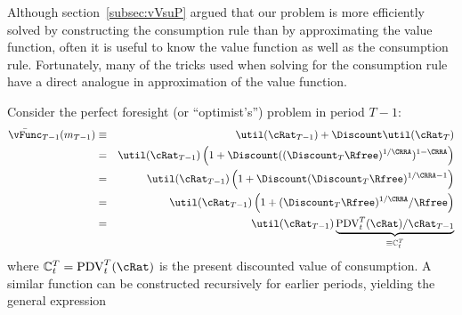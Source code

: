 
  Although section~\ref{subsec:vVsuP} argued that our problem is more
  efficiently solved by constructing the consumption rule than by
  approximating the value function, often it is useful to know the
  value function as well as the consumption rule.  Fortunately, many
  of the tricks used when solving for the consumption rule have a
  direct analogue in approximation of the value function.

  Consider the perfect foresight (or ``optimist's'') problem in period $T-1$:
  \begin{eqnarray*}
    \bar{\vFunc}_{T-1}({m}_{T-1}) & \equiv & \util(\cRat_{T-1})+\Discount \util(\cRat_{T})
    \\ & = & \util(\cRat_{T-1})\left(1+\Discount ((\Discount_{T}\Rfree)^{1/\CRRA})^{1-\CRRA}\right)
    \\ & = & \util(\cRat_{T-1})\left(1+\Discount (\Discount_{T}\Rfree)^{1/\CRRA-1}\right)
    \\ & = & \util(\cRat_{T-1})\left(1+(\Discount_{T}\Rfree)^{1/\CRRA}/\Rfree\right)
    \\ & = & \util(\cRat_{T-1})\underbrace{\mbox{PDV}_{t}^{T}(\cRat)/\cRat_{T-1}}_{\equiv \mathbb{C}_{t}^{T}}
  \end{eqnarray*}
  where $\mathbb{C}_{t}^{T}=\mbox{PDV}_{t}^{T}(\cRat)$ is the present discounted value of consumption.
  A similar function can be constructed recursively for earlier periods, yielding
  the general expression \hypertarget{vFuncPF}{}
